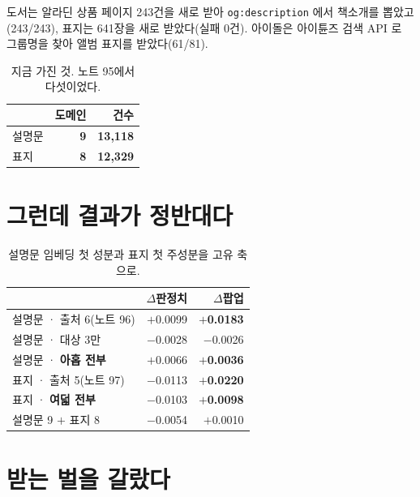 \documentclass[10pt]{article}
\begin{document}
도서는 알라딘 상품 페이지 243건을 새로 받아 \texttt{og:description} 에서
책소개를 뽑았고(243/243), 표지는 641장을 새로 받았다(실패 0건). 아이돌은
아이튠즈 검색 API 로 그룹명을 찾아 앨범 표지를 받았다(61/81).

\begin{table}[t]
\centering\tsize
\caption{지금 가진 것. 노트 95에서 다섯이었다.}
\begin{tabular}{lrr}
\toprule
& 도메인 & 건수 \\
\midrule
설명문 & \textbf{9} & \textbf{13,118} \\
표지 & \textbf{8} & \textbf{12,329} \\
\bottomrule
\end{tabular}
\end{table}

\section{그런데 결과가 정반대다}

\begin{table}[t]
\centering\tsize
\caption{설명문 임베딩 첫 성분과 표지 첫 주성분을 고유 축으로.}
\begin{tabular}{lrr}
\toprule
& $\Delta$판정치 & $\Delta$팝업 \\
\midrule
설명문 · 출처 6(노트 96) & $+$0.0099 & \textbf{$+$0.0183} \\
설명문 · 대상 3만 & $-$0.0028 & $-$0.0026 \\
설명문 · \textbf{아홉 전부} & $+$0.0066 & \textbf{$+$0.0036} \\
\midrule
표지 · 출처 5(노트 97) & $-$0.0113 & \textbf{$+$0.0220} \\
표지 · \textbf{여덟 전부} & $-$0.0103 & \textbf{$+$0.0098} \\
\midrule
설명문 9 $+$ 표지 8 & $-$0.0054 & $+$0.0010 \\
\bottomrule
\end{tabular}
\end{table}


\section{받는 벌을 갈랐다}
\end{document}

